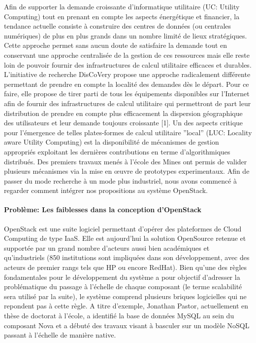 \documentclass[a4paper,11pt]{article}
\newcommand{\discovery}{DisCoVery }
\begin{document}
\begin{note}
 Afin de supporter la demande croissante d'informatique utilitaire (UC: Utility Computing) tout en prenant en compte les aspects énergétique et financier, la tendance actuelle consiste à construire des centres de données (ou centrales numériques) de plus en plus grands dans un nombre limité de lieux stratégiques. Cette approche permet sans aucun doute de satisfaire la demande tout en conservant une approche centralisée de la gestion de ces ressources mais elle reste loin de pouvoir fournir des infrastructures de calcul utilitaire efficaces et durables.
   L'initiative de recherche \discovery propose une approche radicalement différente permettant de prendre en compte la localité des demandes dès le départ.
Pour ce faire, elle propose de tirer parti de tous les équipements
disponibles sur l'Internet afin de fournir des infrastructures de calcul
utilitaire  qui permettront de part leur distribution de prendre en compte plus
efficacement la dispersion géographique des utilisateurs et leur demande
toujours croissante [1]. Un des aspects critique pour l'émergence de telles
plates-formes de calcul utilitaire ''local'' (LUC: Locality aware Utility Computing) est la disponibilité de
mécanismes de gestion appropriés exploitant les dernières
contributions en terme d'algorithmiques distribués.
Des premiers travaux menés à l'école des Mines ont permis de valider
plusieurs mécanismes via la mise en \oe uvre de prototypes
experimentaux.
Afin de passer du mode recherche à un mode plus industriel, nous
avons commencé à regarder comment intégrer nos propositions au système
OpenStack.

\paragraph*{Problème: Les faiblesses dans la conception d'OpenStack\\}

  OpenStack est une suite logiciel permettant d'opérer des plateformes
  de Cloud Computing de type IaaS. Elle est aujourd'hui la solution
  OpenSource retenue et supportée par un grand nombre d'acteurs
  aussi bien académiques et qu'industriels (850 institutions sont
  impliquées dans son développement, avec des acteurs de premier rangs
  tels que HP ou encore RedHat).
  Bien qu'une des règles fondamentales pour le développement du
  système a pour objectif d'adresser la problématique du passage à
  l'échelle de chaque composant (le terme scalabilité sera utilisé par
  la suite), le système comprend plusieurs briques
  logicielles qui ne repondent pas à
  cette règle. A titre d'exemple, Jonathan Pastor, actuellement en
  thèse de doctorat à l'école, a identifié la base de données MySQL au
  sein du composant Nova et a débuté des travaux visant à basculer sur
  un modèle NoSQL passant à l'échelle de manière native.



\end{note}
\end{document}
